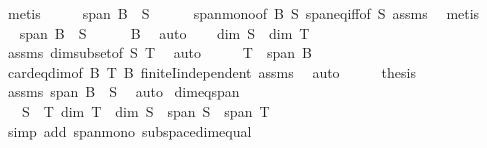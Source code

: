 \begin{isabellebody}
\ metis\isanewline
\ \ \isamarkupfalse%
\ \isamarkupfalse%
\ {\isachardoublequoteopen}span\ B\ {\isasymsubseteq}\ S{\isachardoublequoteclose}\isanewline
\ \ \ \ \isamarkupfalse%
\ span{\isacharunderscore}{\kern0pt}mono{\isacharbrackleft}{\kern0pt}of\ B\ S{\isacharbrackright}{\kern0pt}\ span{\isacharunderscore}{\kern0pt}eq{\isacharunderscore}{\kern0pt}iff{\isacharbrackleft}{\kern0pt}of\ S{\isacharbrackright}{\kern0pt}\ assms\ \isamarkupfalse%
\ metis\isanewline
\ \ \isamarkupfalse%
\ \isamarkupfalse%
\ {\isachardoublequoteopen}span\ B\ {\isacharequal}{\kern0pt}\ S{\isachardoublequoteclose}\isanewline
\ \ \ \ \isamarkupfalse%
\ B\ \isamarkupfalse%
\ auto\isanewline
\ \ \isamarkupfalse%
\ {\isachardoublequoteopen}dim\ S\ {\isacharequal}{\kern0pt}\ dim\ T{\isachardoublequoteclose}\isanewline
\ \ \ \ \isamarkupfalse%
\ assms\ dim{\isacharunderscore}{\kern0pt}subset{\isacharbrackleft}{\kern0pt}of\ S\ T{\isacharbrackright}{\kern0pt}\ \isamarkupfalse%
\ auto\isanewline
\ \ \isamarkupfalse%
\ \isamarkupfalse%
\ {\isachardoublequoteopen}T\ {\isasymsubseteq}\ span\ B{\isachardoublequoteclose}\isanewline
\ \ \ \ \isamarkupfalse%
\ card{\isacharunderscore}{\kern0pt}eq{\isacharunderscore}{\kern0pt}dim{\isacharbrackleft}{\kern0pt}of\ B\ T{\isacharbrackright}{\kern0pt}\ B\ finiteI{\isacharunderscore}{\kern0pt}independent\ assms\ \isamarkupfalse%
\ auto\isanewline
\ \ \isamarkupfalse%
\ \isamarkupfalse%
\ {\isacharquery}{\kern0pt}thesis\isanewline
\ \ \ \ \isamarkupfalse%
\ assms\ {\isacartoucheopen}span\ B\ {\isacharequal}{\kern0pt}\ S{\isacartoucheclose}\ \isamarkupfalse%
\ auto\isanewline
{}\isamarkupfalse%
%
\endisatagproof
{\isafoldproof}%
%
\isadelimproof
\isanewline
%
\endisadelimproof
\isanewline
{}\isamarkupfalse%
\ dim{\isacharunderscore}{\kern0pt}eq{\isacharunderscore}{\kern0pt}span{\isacharcolon}{\kern0pt}\isanewline
\ \ \ {\isachardoublequoteopen}{\isasymlbrakk}S\ {\isasymsubseteq}\ T{\isacharsemicolon}{\kern0pt}\ dim\ T\ {\isasymle}\ dim\ S{\isasymrbrakk}\ {\isasymLongrightarrow}\ span\ S\ {\isacharequal}{\kern0pt}\ span\ T{\isachardoublequoteclose}\isanewline
%
\isadelimproof
\ \ %
\endisadelimproof
%
\isatagproof
{}\isamarkupfalse%
\ {\isacharparenleft}{\kern0pt}simp\ add{\isacharcolon}{\kern0pt}\ span{\isacharunderscore}{\kern0pt}mono\ subspace{\isacharunderscore}{\kern0pt}dim{\isacharunderscore}{\kern0pt}equal{\isacharparenright}{\kern0pt}%

\end{isabellebody}

